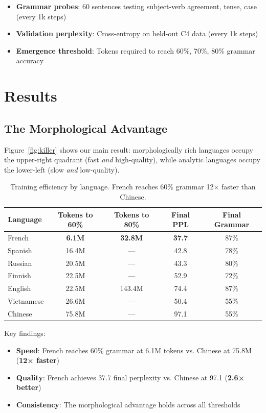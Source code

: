 \documentclass[11pt]{article}
\begin{document}
\begin{itemize}
    \item \textbf{Grammar probes}: 60 sentences testing subject-verb agreement, tense, case (every 1k steps)
    \item \textbf{Validation perplexity}: Cross-entropy on held-out C4 data (every 1k steps)
    \item \textbf{Emergence threshold}: Tokens required to reach 60\%, 70\%, 80\% grammar accuracy
\end{itemize}

\section{Results}

\subsection{The Morphological Advantage}

Figure~\ref{fig:killer} shows our main result: morphologically rich languages occupy the upper-right quadrant (fast \textit{and} high-quality), while analytic languages occupy the lower-left (slow \textit{and} low-quality).

\begin{table}[h]
\centering
\begin{tabular}{lcccc}
\toprule
Language & Tokens to 60\% & Tokens to 80\% & Final PPL & Final Grammar \\
\midrule
French & \textbf{6.1M} & \textbf{32.8M} & \textbf{37.7} & 87\% \\
Spanish & 16.4M & — & 42.8 & 78\% \\
Russian & 20.5M & — & 43.3 & 80\% \\
Finnish & 22.5M & — & 52.9 & 72\% \\
English & 22.5M & 143.4M & 74.4 & 87\% \\
Vietnamese & 26.6M & — & 50.4 & 55\% \\
Chinese & 75.8M & — & 97.1 & 55\% \\
\bottomrule
\end{tabular}
\caption{Training efficiency by language. French reaches 60\% grammar 12× faster than Chinese.}
\label{tab:efficiency}
\end{table}

Key findings:
\begin{itemize}
    \item \textbf{Speed}: French reaches 60\% grammar at 6.1M tokens vs. Chinese at 75.8M (\textbf{12× faster})
    \item \textbf{Quality}: French achieves 37.7 final perplexity vs. Chinese at 97.1 (\textbf{2.6× better})
    \item \textbf{Consistency}: The morphological advantage holds across all thresholds
\end{itemize}
\end{document}

